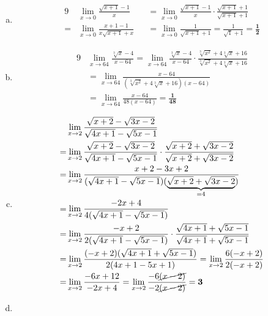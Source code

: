 \documentclass[]{article}
\newcommand\sen   {\selectlanguage{english}}
\newcommand\limz  {\lim_{x \to 0}}
\begin{document}
	\section{} %
	\sen
	\begin{enumerate}[(a)]
		\item \begin{alignat*}{9}
			&\limz \frac{\sqrt{x + 1} - 1}{x} &&= \limz \frac{\sqrt{x + 1} - 1}{x} \cdot \frac{\sqrt{x + 1} + 1}{\sqrt{x + 1} + 1} \\
			=& \limz \frac{x + 1 - 1}{x \sqrt{x + 1} + x} &&= \limz \frac{1}{\sqrt{x + 1} + 1} = \frac{1}{\sqrt{1} + 1} = \bm{\frac{1}{2}}
		\end{alignat*}
		\item \begin{alignat*}{9}
			&\lim_{x \to 64} \frac{\sqrt[3]{x} - 4}{x - 64} = \lim_{x \to 64} \frac{\sqrt[3]{x} - 4}{x - 64}  \cdot \frac{\sqrt[3]{x^2}  + 4 \sqrt[3]{x} + 16}{\sqrt[3]{x^2} + 4 \sqrt[3]{x} + 16} \\
			&= \lim_{x \to 64}\frac{x - 64}{(\sqrt[3]{x^2} + 4 \sqrt[3]{x} + 16)(x - 64)} \\
			&= \lim_{x \to 64}\frac{x - 64}{48(x - 64)} = \bm{\frac{1}{48}}
		\end{alignat*}
		\item 
		\begin{alignat*}{9}
			 & \lim_{x \to 2} \frac{\sqrt{x + 2} - \sqrt{3x - 2}}{\sqrt{4x + 1} - \sqrt{5x - 1}} \\
			=& \lim_{x \to 2} \frac{\sqrt{x + 2} - \sqrt{3x - 2}}{\sqrt{4x + 1} - \sqrt{5x - 1}} \cdot  \frac{\sqrt{x + 2} +  \sqrt{3x - 2}}{\sqrt{x + 2} +  \sqrt{3x - 2}} \\
			=& \lim_{x \to 2} \frac{x + 2 - 3x + 2}{(\sqrt{4x + 1} - \sqrt{5x - 1})(\underbrace{\sqrt{x + 2} +  \sqrt{3x - 2}}_{=4})} \\
			=& \lim_{x \to 2} \frac{-2x + 4}{4(\sqrt{4x + 1} - \sqrt{5x - 1})} \\
			=& \lim_{x \to 2} \frac{-x + 2}{2(\sqrt{4x + 1} - \sqrt{5x - 1})} \cdot \frac{\sqrt{4x + 1} + \sqrt{5x - 1}}{\sqrt{4x + 1} + \sqrt{5x - 1}} \\
			=& \lim_{x \to 2} \frac{(-x + 2)(\sqrt{4x + 1} + \sqrt{5x - 1})}{2(4x + 1 - 5x + 1)} = \lim_{x \to 2}\frac{6(-x + 2)}{2(-x + 2)} \\
			=& \lim_{x \to 2} \frac{-6x + 12}{-2x + 4} = \lim_{x \to 2}\frac{-6\cancel{(x - 2)}}{-2\cancel{(x - 2)}} = \bm{3}
		\end{alignat*}
		\item 

\end{enumerate}
\end{document}

